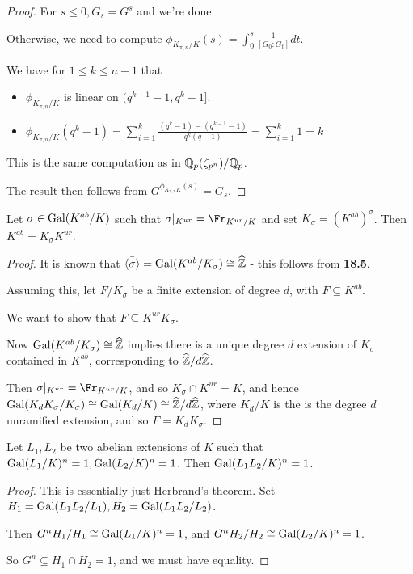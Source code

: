 \documentclass[10pt,a4paper]{article}
\begin{document}
\begin{proof}
  For $s\leq 0, G_s = G^s$ and we're done.

  Otherwise, we need to compute $\phi_{K_{\pi,n}/K}(s) = \int_0^s \frac{1}{[G_0:G_t]} dt$.

  We have for $1 \leq k \leq n-1$ that
  \begin{itemize}
    \item $\phi_{K_{\pi,n}/K}$ is linear on $(q^{k-1}-1, q^k-1]$.
    \item $\phi_{K_{\pi,n}/K}(q^k-1) = \sum_{i=1}^k \frac{(q^k-1)-(q^{k-1}-1)}{q^k(q-1)} = \sum_{i=1}^k 1 = k$
  \end{itemize}
  This is the same computation as in $\mathbb{Q}_p(\zeta_{p^n})/\mathbb{Q}_p$.

  The result then follows from $G^{\phi_{K_{\pi,n}K}(s)} = G_s$.
\end{proof}
\begin{proposition}
  Let $\sigma \in \operatorname{Gal}(K^{ab}/K)$ such that $\sigma|_{K^{ur}} = \Fr_{K^{ur}/K}$ and set $K_\sigma  = (K^{ab})^\sigma$. Then $K^{ab} = K_\sigma K^{ur}$.
\end{proposition}
\begin{proof}
  It is known that $\bar{\langle \sigma \rangle} = \operatorname{Gal}(K^{ab}/K_\sigma) \cong \widehat{\mathbb{Z}}$ - this follows from \textbf{18.5}.

  Assuming this, let $F/K_\sigma$ be a finite extension of degree $d$, with $F \subseteq K^{ab}$.

  We want to show that $F \subseteq K^{ur}K_\sigma$.

  Now $\operatorname{Gal}(K^{ab}/K_\sigma) \cong \widehat{\mathbb{Z}}$ implies there is a unique degree $d$ extension of $K_\sigma$ contained in $K^{ab}$, corresponding to $\widehat{\mathbb{Z}}/d\widehat{\mathbb{Z}}$.

  Then $\sigma|_{K^{ur}} = \Fr_{K^{ur}/K}$, and so $K_\sigma \cap K^{ur} = K$, and hence $\operatorname{Gal}(K_dK_\sigma/K_\sigma) \cong \operatorname{Gal}(K_d/K) \cong \widehat{\mathbb{Z}}/d\widehat{\mathbb{Z}}$, where $K_d/K$ is the is the degree $d$ unramified extension, and so $F = K_dK_\sigma$.
\end{proof}
\begin{lemma}
  Let $L_1, L_2$ be two abelian extensions of $K$ such that $\operatorname{Gal}(L_1/K)^n = 1, \operatorname{Gal}(L_2/K)^n = 1$. Then $\operatorname{Gal}(L_1L_2/K)^n = 1$.
\end{lemma}
\begin{proof}
  This is essentially just Herbrand's theorem. Set $H_1 = \operatorname{Gal}(L_1L_2/L_1), H_2 = \operatorname{Gal}(L_1L_2/L_2)$.

  Then $G^nH_1/H_1 \cong \operatorname{Gal}(L_1/K)^n = 1$, and $G^nH_2/H_2 \cong \operatorname{Gal}(L_2/K)^n = 1$.

  So $G^n \subseteq H_1 \cap H_2 = 1$, and we must have equality.
\end{proof}
\end{document}
